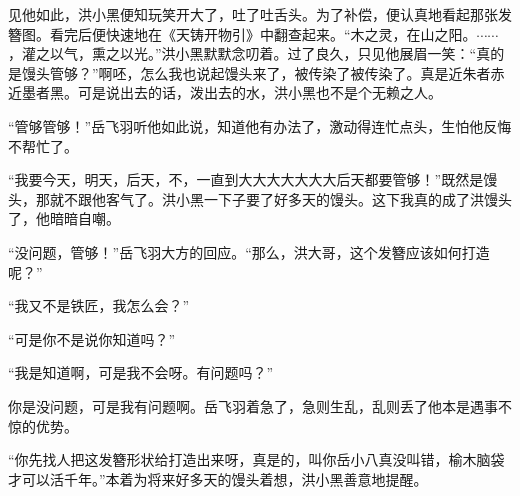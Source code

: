 见他如此，洪小黑便知玩笑开大了，吐了吐舌头。为了补偿，便认真地看起那张发簪图。看完后便快速地在《天铸开物引》中翻查起来。“木之灵，在山之阳。$\cdots\cdots$，灌之以气，熏之以光。”洪小黑默默念叨着。过了良久，只见他展眉一笑：“真的是馒头管够？”啊呸，怎么我也说起馒头来了，被传染了被传染了。真是近朱者赤近墨者黑。可是说出去的话，泼出去的水，洪小黑也不是个无赖之人。

“管够管够！”岳飞羽听他如此说，知道他有办法了，激动得连忙点头，生怕他反悔不帮忙了。

“我要今天，明天，后天，不，一直到大大大大大大大后天都要管够！”既然是馒头，那就不跟他客气了。洪小黑一下子要了好多天的馒头。这下我真的成了洪馒头了，他暗暗自嘲。

“没问题，管够！”岳飞羽大方的回应。“那么，洪大哥，这个发簪应该如何打造呢？”

“我又不是铁匠，我怎么会？”

“可是你不是说你知道吗？”

“我是知道啊，可是我不会呀。有问题吗？”

你是没问题，可是我有问题啊。岳飞羽着急了，急则生乱，乱则丢了他本是遇事不惊的优势。

“你先找人把这发簪形状给打造出来呀，真是的，叫你岳小八真没叫错，榆木脑袋才可以活千年。”本着为将来好多天的馒头着想，洪小黑善意地提醒。